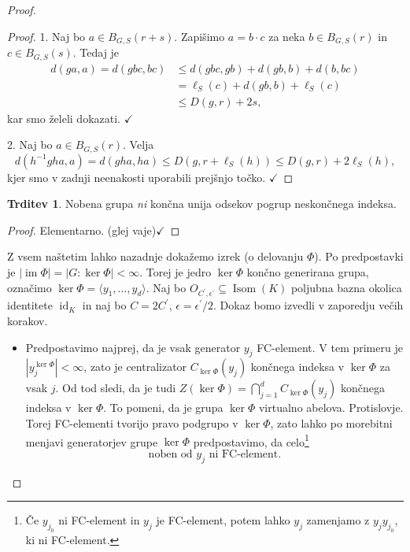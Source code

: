 \documentclass[11pt]{book}
\DeclareMathOperator\image{im}
\DeclareMathOperator\Isom{Isom}
\DeclareMathOperator\id{id}
\def\literatura{\color{modra}}
\def\vaje{{\literatura (glej vaje)}}
\def\kljuka{$\checkmark$}
\theoremstyle{definition}
\theoremstyle{zgled}
\theoremstyle{odprtproblem}
\theoremstyle{domacanaloga}
\newenvironment{dokaz}
    {\color{siva}\begin{proof}}
    {\end{proof}}
\theoremstyle{izrek}
\newtheorem*{trditev}{Trditev}
\begin{document}
\begin{dokaz}
\begin{dokaz}
1. Naj bo $a \in B_{G,S}(r+s)$. Zapišimo $a = b \cdot c$ za neka $b \in B_{G,S}(r)$ in $c \in B_{G,S}(s)$. Tedaj je 
\begin{align*}
d(ga,a) = d(gbc,bc) 
&\leq d(gbc, gb) + d(gb, b) + d(b, bc) \\
&= \ell_S(c) + d(gb,b) + \ell_S(c) \\
&\leq D(g,r) + 2s,
\end{align*}
kar smo želeli dokazati. \kljuka

2. Naj bo $a \in B_{G,S}(r)$. Velja
\[
d(h^{-1}gha,a) = d(gha, ha) \leq D(g, r + \ell_S(h)) \leq D(g,r) + 2 \ell_S(h),
\]
kjer smo v zadnji neenakosti uporabili prejšnjo točko. \kljuka
\end{dokaz}


\begin{trditev}
Nobena grupa {\em ni} končna unija odsekov pogrup neskončnega indeksa.
\end{trditev}

\begin{dokaz}
Elementarno. \vaje \kljuka
\end{dokaz}


Z vsem naštetim lahko nazadnje dokažemo izrek {\sc (o delovanju $\Phi$)}. Po predpostavki je $|\image \Phi| = |G : \ker \Phi| < \infty$. Torej je jedro $\ker \Phi$ končno generirana grupa, označimo $\ker \Phi = \langle y_1, \dots, y_d \rangle$. Naj bo $O_{C^\prime, \epsilon^\prime} \subseteq \Isom(K)$ poljubna bazna okolica identitete $\id_K$ in naj bo $C = 2 C^\prime$, $\epsilon = \epsilon^\prime/2$. Dokaz bomo izvedli v zaporedju večih korakov.

\begin{itemize}
    \item Predpostavimo najprej, da je vsak generator $y_j$ FC-element. V tem primeru je $|y_j^{\ker \Phi}| < \infty$, zato je centralizator $C_{\ker \Phi}(y_j)$ končnega indeksa v $\ker \Phi$ za vsak $j$. Od tod sledi, da je tudi $Z(\ker \Phi) = \bigcap_{j = 1}^d C_{\ker \Phi}(y_j)$ končnega indeksa v $\ker \Phi$. To pomeni, da je grupa $\ker \Phi$ virtualno abelova. Protislovje. Torej FC-elementi tvorijo pravo podgrupo v $\ker \Phi$, zato lahko po morebitni menjavi generatorjev grupe $\ker \Phi$ predpostavimo, da celo\footnote{Če $y_{j_0}$ ni FC-element in $y_j$ je FC-element, potem lahko $y_j$ zamenjamo z $y_j y_{j_0}$, ki ni FC-element.}
    \[
    \text{noben od $y_j$ ni FC-element.}
    \]


\end{itemize}
\end{dokaz}
\end{document}
